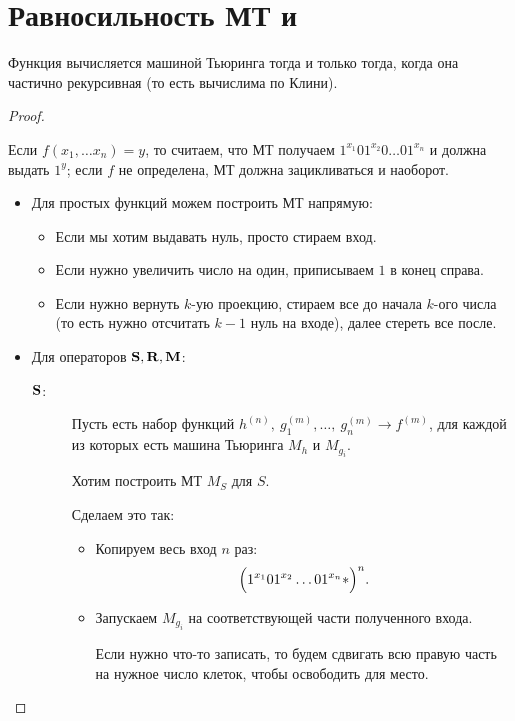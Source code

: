 \section{Равносильность МТ и \crf} 
\begin{thm}
	Функция вычисляется машиной Тьюринга тогда и только тогда, когда она частично рекурсивная (то есть вычислима по Клини).
\end{thm}
\begin{proof}
    \begin{description}
        \item {} 
			Если $ f(x_1, \ldots x_n) = y$, то считаем, что МТ получаем $ 1^{x_1}01^{x_2}0\ldots 01^{x_n}$ и должна выдать $ 1^{y}$; если  $ f$ не определена, МТ должна зацикливаться и наоборот.
			\begin{itemize}
				\item Для простых функций можем построить МТ напрямую:
					\begin{itemize}
						\item Если мы хотим выдавать нуль, просто стираем вход.
						\item Если нужно увеличить число на один, приписываем $ 1$ в конец справа.
						\item Если нужно вернуть $ k$-ую проекцию, стираем все до начала $ k$-ого числа (то есть нужно отсчитать $ k-1$ нуль на входе), далее стереть все после.
					\end{itemize}
				\item Для операторов $ \S, \R, \M$:
					\begin{description}
						\item[$ \S$:]
							Пусть есть набор функций $ h^{(n)}, ~ g_1^{(m)}, \ldots , ~ g_n^{(m)} \longrightarrow f^{(m)}$, для каждой из которых есть машина Тьюринга $ M_{h}$ и $ M_{g_{i}}$. 

							Хотим построить МТ $ M_{S}$ для $ S$.

							Сделаем это так:
							\begin{itemize}
								\item Копируем весь вход $ n$ раз:
									\[
										\Bigl(1^{x_1}01^{x_2}\ldots 01^{x_n} \ast \Bigr)^{n}
									.\] 
								\item Запускаем $ M_{g_i}$ на соответствующей части полученного входа. 

							Если нужно что-то записать, то будем сдвигать всю правую часть на нужное число клеток, чтобы освободить для место.


\end{itemize}
\end{description}
\end{itemize}
\end{description}
\end{proof}
